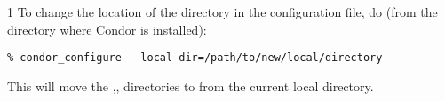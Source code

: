 \begin{ManPage}{\label{man-condor-configure}}{1}
To change the location of the  directory
in the configuration file, do (from the directory where Condor is installed):
\footnotesize
\begin{verbatim}
% condor_configure --local-dir=/path/to/new/local/directory
\end{verbatim}
\normalsize
This will move the ,, directories
to  from the current local directory.



\end{ManPage}
